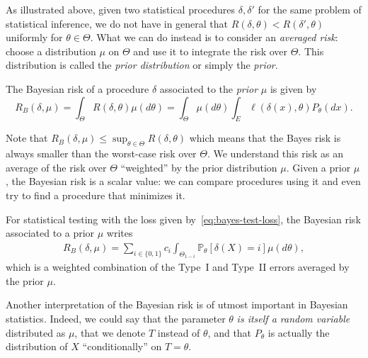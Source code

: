 \documentclass[
	fontsize=11pt, %
	twoside=false, %
	numbers=noenddot, %
]{kaobook}
\renewcommand{\P}{\mathbb P}
\begin{document}

As illustrated above, given two statistical procedures $\delta, \delta'$ for the same problem of statistical inference, we do not have in general that $R(\delta, \theta) < R(\delta', \theta)$ uniformly for $\theta \in \Theta$.
What we can do instead is to consider an \emph{averaged risk}: choose a distribution $\mu$ on $\Theta$ and use it to integrate the risk over $\Theta$.
This distribution is called the \emph{prior distribution} or simply the \emph{prior}.
\begin{definition}
	The Bayesian risk of a procedure $\delta$ associated to the \emph{prior} $\mu$ is given by
	\begin{equation*}
		R_B(\delta, \mu) = \int_{\Theta} R(\delta, \theta) \mu(d \theta) 
		= \int_{\Theta} \mu(d \theta) \int_E \ell(\delta(x), \theta) P_\theta(dx).
	\end{equation*}
\end{definition}
Note that $R_B(\delta, \mu) \leq \sup_{\theta \in \Theta} R(\delta, \theta)$ which means that the Bayes risk is always smaller than the worst-case risk over $\Theta$.
We understand this risk as an average of the risk over $\Theta$ ``weighted'' by the prior distribution $\mu$.
Given a prior $\mu$, the Bayesian risk is a scalar value: we can compare procedures using it and even try to find a procedure that minimizes it.%

\begin{example}
	For statistical testing with the loss given by~\eqref{eq:bayes-test-loss}, the Bayesian risk associated to a prior $\mu$ writes
	\begin{align*}
		R_B(\delta, \mu) = \sum_{i \in \{ 0, 1 \}} c_i \int_{\Theta_{1 - i}} \P_\theta[\delta(X) = i] \mu(d \theta),
	\end{align*}
	which is a weighted combination of the Type~I and Type~II errors averaged by the prior $\mu$.
\end{example}

Another interpretation of the Bayesian risk is of utmost important in Bayesian statistics.
Indeed, we could say that the parameter $\theta$ \emph{is itself a random variable} distributed as $\mu$, that we denote $T$ instead of $\theta$, and that $P_\theta$ is actually the distribution of $X$ ``conditionally'' on $T = \theta$.%
\end{document}
